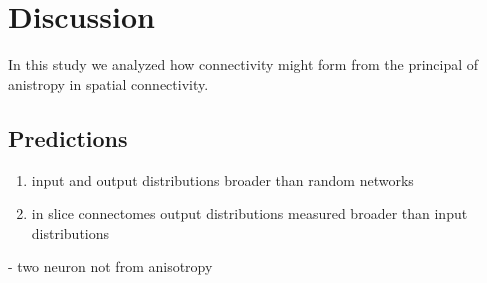 \clearpage
\pagebreak
\newpage

\section*{Discussion}

In this study we analyzed how connectivity might form from the principal of anistropy in spatial connectivity.





\subsection*{Predictions}

\begin{enumerate}
\item input and output distributions broader than random networks
\item in slice connectomes output distributions measured broader than input distributions
\end{enumerate}


- two neuron not from anisotropy